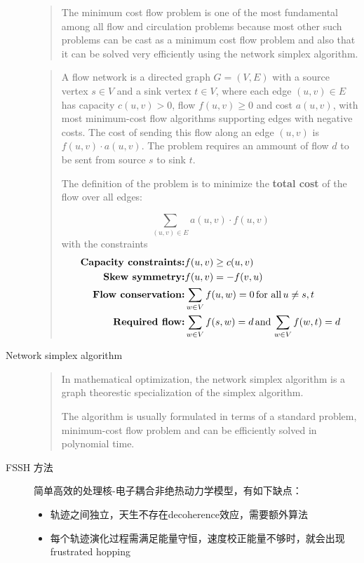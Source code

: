 \begin{description}
\begin{quote}
	The minimum cost flow problem is one of the most fundamental among all flow and circulation problems because most other such problems can be cast as a minimum cost flow problem and also that it can be solved very efficiently using the network simplex algorithm.
	\end{quote}

	\begin{quote}
	A flow network is a directed graph $G=(V,E)$ with a source vertex $s \in V$ and a sink vertex $t \in V$, where each edge $(u,v)\in E$ has capacity $c(u,v) > 0$, flow $f(u,v) \geq 0$ and cost $a(u,v)$, with most minimum-cost flow algorithms supporting edges with negative costs. The cost of sending this flow along an edge $(u,v)$ is $f(u,v) \cdot a(u,v)$. The problem requires an ammount of flow $d$ to be sent from source $s$ to sink $t$.

	The definition of the problem is to minimize the \textbf{total cost} of the flow over all edges:

	\begin{equation}
	\sum_{(u,v)\in E} a(u,v) \cdot f(u,v)
	\end{equation}
	with the constraints
	\begin{align*}
	\text{\textbf{Capacity constraints:}} & f(u,v)\geq c(u,v) \\
	\text{\textbf{Skew symmetry:}} & f(u,v)=-f(v,u)\\
	\text{\textbf{Flow conservation:}} & \sum_{w\in V}f(u,w)=0 \,\text{for all} \, u \neq s,t\\
	\text{\textbf{Required flow:}} & \sum_{w\in V} f(s,w) = d \,\text{and} \,\sum_{w\in V} f(w,t) =d 
	\end{align*}
	\end{quote}
	\item[Network simplex algorithm]
	
	\begin{quote}
	In mathematical optimization, the network simplex algorithm is a graph theorestic specialization of the simplex algorithm.

	The algorithm is usually formulated in terms of a standard problem, minimum-cost flow problem and can be efficiently solved in polynomial time.
	\end{quote}

	\item[FSSH 方法] 简单高效的处理核-电子耦合非绝热动力学模型，有如下缺点：

	\begin{itemize}
	\item 轨迹之间独立，天生不存在decoherence效应，需要额外算法
	\item 每个轨迹演化过程需满足能量守恒，速度校正能量不够时，就会出现frustrated hopping
	\end{itemize}


\end{description}
